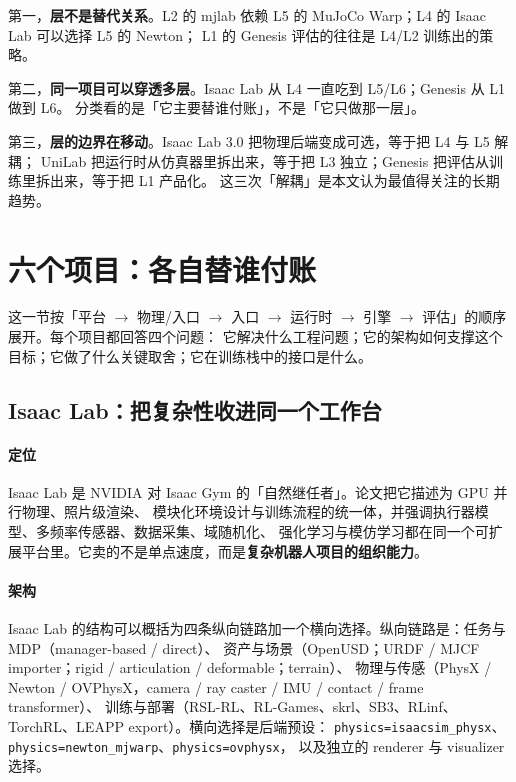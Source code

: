 \documentclass[UTF8, 11pt, a4paper, fontset=windows]{ctexart}
\newcommand{\term}[1]{\texttt{#1}}
\begin{document}
第一，\textbf{层不是替代关系}。L2 的 mjlab 依赖 L5 的 MuJoCo Warp；L4 的 Isaac Lab 可以选择 L5 的 Newton；
L1 的 Genesis 评估的往往是 L4/L2 训练出的策略。

第二，\textbf{同一项目可以穿透多层}。Isaac Lab 从 L4 一直吃到 L5/L6；Genesis 从 L1 做到 L6。
分类看的是「它主要替谁付账」，不是「它只做那一层」。

第三，\textbf{层的边界在移动}。Isaac Lab 3.0 把物理后端变成可选，等于把 L4 与 L5 解耦；
UniLab 把运行时从仿真器里拆出来，等于把 L3 独立；Genesis 把评估从训练里拆出来，等于把 L1 产品化。
这三次「解耦」是本文认为最值得关注的长期趋势。

\section{六个项目：各自替谁付账}\label{sec:projects}

这一节按「平台 $\rightarrow$ 物理/入口 $\rightarrow$ 入口 $\rightarrow$ 运行时 $\rightarrow$ 引擎 $\rightarrow$ 评估」的顺序展开。每个项目都回答四个问题：
它解决什么工程问题；它的架构如何支撑这个目标；它做了什么关键取舍；它在训练栈中的接口是什么。

\subsection{Isaac Lab：把复杂性收进同一个工作台}

\paragraph{定位}
Isaac Lab 是 NVIDIA 对 Isaac Gym 的「自然继任者」。论文把它描述为 GPU 并行物理、照片级渲染、
模块化环境设计与训练流程的统一体，并强调执行器模型、多频率传感器、数据采集、域随机化、
强化学习与模仿学习都在同一个可扩展平台里。它卖的不是单点速度，而是\textbf{复杂机器人项目的组织能力}。

\paragraph{架构}
Isaac Lab 的结构可以概括为四条纵向链路加一个横向选择。纵向链路是：任务与 MDP（manager-based / direct）、
资产与场景（OpenUSD；URDF / MJCF importer；rigid / articulation / deformable；terrain）、
物理与传感（PhysX / Newton / OVPhysX，camera / ray caster / IMU / contact / frame transformer）、
训练与部署（RSL-RL、RL-Games、skrl、SB3、RLinf、TorchRL、LEAPP export）。横向选择是后端预设：
\term{physics=isaacsim\_physx}、\term{physics=newton\_mjwarp}、\term{physics=ovphysx}，
以及独立的 renderer 与 visualizer 选择。
\end{document}
